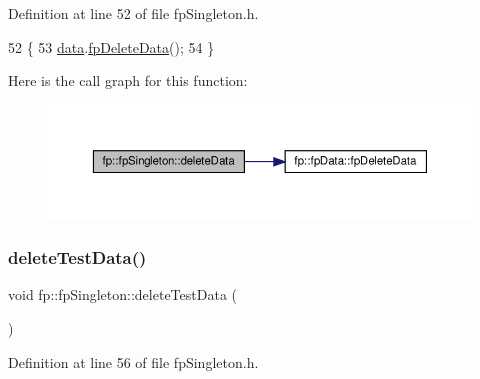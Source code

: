 Definition at line 52 of file fp\+Singleton.\+h.


\begin{DoxyCode}
52                                     \{
53                 \hyperlink{classfp_1_1fpSingleton_a2fa16ac6a0f66641749032eeee61b8e9}{data}.\hyperlink{classfp_1_1fpData_a44df119acad6c339966d67f2c634a369}{fpDeleteData}();
54             \}
\end{DoxyCode}
Here is the call graph for this function\+:\nopagebreak
\begin{figure}[H]
\begin{center}
\leavevmode
\includegraphics[width=350pt]{classfp_1_1fpSingleton_a204b85f9d08ca711ca6620b5e020cc1c_cgraph}
\end{center}
\end{figure}
\mbox{\label{classfp_1_1fpSingleton_aa4ac02c580b06ba16ed0160ec694438d}} 
\subsubsection{\texorpdfstring{delete\+Test\+Data()}{deleteTestData()}}
{\footnotesize\ttfamily void fp\+::fp\+Singleton\+::delete\+Test\+Data (\begin{DoxyParamCaption}{ }\end{DoxyParamCaption})\hspace{0.3cm}{\ttfamily [inline]}}



Definition at line 56 of file fp\+Singleton.\+h.


